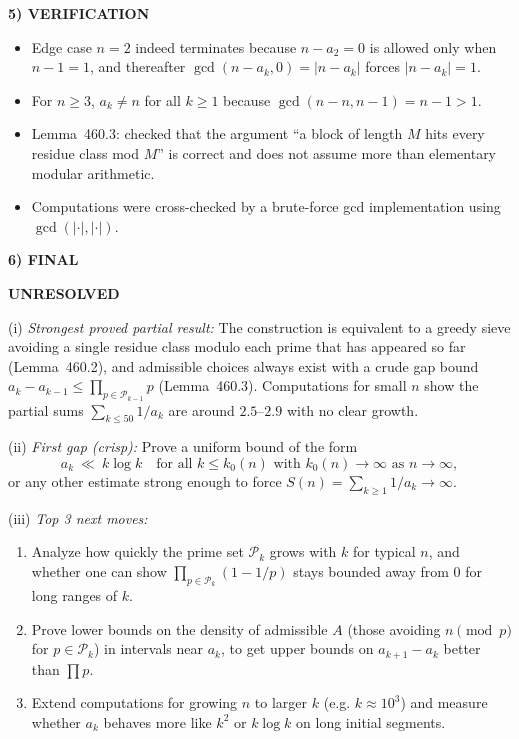 \medskip
\noindent\textbf{5) VERIFICATION}

\begin{itemize}
\item Edge case $n=2$ indeed terminates because $n-a_2=0$ is allowed only when $n-1=1$, and thereafter $\gcd(n-a_k,0)=|n-a_k|$ forces $|n-a_k|=1$.
\item For $n\ge 3$, $a_k\neq n$ for all $k\ge 1$ because $\gcd(n-n,n-1)=n-1>1$.
\item Lemma~460.3: checked that the argument ``a block of length $M$ hits every residue class mod $M$'' is correct and does not assume more than elementary modular arithmetic.
\item Computations were cross-checked by a brute-force gcd implementation using $\gcd(|\cdot|,|\cdot|)$.
\end{itemize}

\noindent\textbf{6) FINAL}

\textbf{UNRESOLVED}

(i) \emph{Strongest proved partial result:} The construction is equivalent to a greedy sieve avoiding a single residue class modulo each prime that has appeared so far (Lemma~460.2), and admissible choices always exist with a crude gap bound $a_k-a_{k-1}\le \prod_{p\in\mathcal P_{k-1}}p$ (Lemma~460.3). Computations for small $n$ show the partial sums $\sum_{k\le 50}1/a_k$ are around $2.5$--$2.9$ with no clear growth.

(ii) \emph{First gap (crisp):} Prove a uniform bound of the form
\[a_k\ \ll\ k\log k\quad\text{for all }k\le k_0(n)\text{ with }k_0(n)\to\infty\text{ as }n\to\infty,
\]
or any other estimate strong enough to force $S(n)=\sum_{k\ge 1}1/a_k\to\infty$.

(iii) \emph{Top 3 next moves:}
\begin{enumerate}
\item Analyze how quickly the prime set $\mathcal P_k$ grows with $k$ for typical $n$, and whether one can show $\prod_{p\in\mathcal P_k}(1-1/p)$ stays bounded away from $0$ for long ranges of $k$.
\item Prove lower bounds on the density of admissible $A$ (those avoiding $n\pmod p$ for $p\in\mathcal P_k$) in intervals near $a_k$, to get upper bounds on $a_{k+1}-a_k$ better than $\prod p$.
\item Extend computations for growing $n$ to larger $k$ (e.g. $k\approx 10^3$) and measure whether $a_k$ behaves more like $k^2$ or $k\log k$ on long initial segments.
\end{enumerate}

